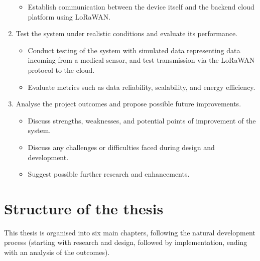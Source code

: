 \begin{enumerate}
\begin{itemize}
		\item Establish communication between the device itself and the backend cloud platform using LoRaWAN.
	\end{itemize}
	\item Test the system under realistic conditions and evaluate its performance.
	\begin{itemize}
		\item Conduct testing of the system with simulated data representing data incoming from a medical sensor, and test transmission via the LoRaWAN protocol to the cloud.
		\item Evaluate metrics such as data reliability, scalability, and energy efficiency.
	\end{itemize}
	\item Analyse the project outcomes and propose possible future improvements.
	\begin{itemize}
		\item Discuss strengths, weaknesses, and potential points of improvement of the system.
		\item Discuss any challenges or difficulties faced during design and development.
		\item Suggest possible further research and enhancements.
	\end{itemize}
\end{enumerate}

\section{Structure of the thesis} %
This thesis is organised into six main chapters, following the natural development process (starting with research and design, followed by implementation, ending with an analysis of the outcomes).

